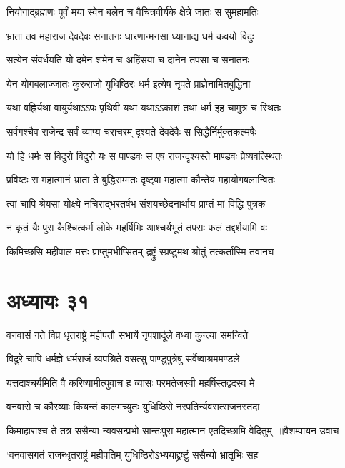 \twolineshloka
{नियोगाद्ब्रह्मणः पूर्वं मया स्वेन बलेन च}
{वैचित्रवीर्यके क्षेत्रे जातः स सुमहामतिः}


\twolineshloka
{भ्राता तव महाराज देवदेवः सनातनः}
{धारणान्मनसा ध्यानाद्य धर्म कवयो विदुः}


\twolineshloka
{सत्येन संवर्धयति यो दमेन शमेन च}
{अहिंसया च दानेन तपसा च सनातनः}


\twolineshloka
{येन योगबलाज्जातः कुरुराजो युधिष्ठिरः}
{धर्म इत्येष नृपते प्राज्ञेनामितबुद्धिना}


\twolineshloka
{यथा वह्निर्यथा वायुर्यथाऽऽपः पृथिवी यथा}
{यथाऽऽकाशं तथा धर्म इह चामुत्र च स्थितः}


\twolineshloka
{सर्वगश्चैव राजेन्द्र सर्वं व्याप्य चराचरम्}
{दृश्यते देवदेवैः स सिद्धैर्निर्मुक्तकल्मषैः}


\twolineshloka
{यो हि धर्मः स विदुरो विदुरो यः स पाण्डवः}
{स एष राजन्दृश्यस्ते माण्डवः प्रेष्यवत्स्थितः}


\twolineshloka
{प्रविष्टः स महात्मानं भ्राता ते बुद्धिसम्मतः}
{दृष्ट्वा महात्मा कौन्तेयं महायोगबलान्वितः}


\twolineshloka
{त्वां चापि श्रेयसा योक्ष्ये नचिराद्भरतर्षभ}
{संशयच्छेदनार्थाय प्राप्तं मां विद्धि पुत्रक}


\twolineshloka
{न कृतं यैः पुरा कैश्चित्कर्म लोके महर्षिभिः}
{आश्चर्यभूतं तपसः फलं तद्दर्शयामि वः}


\twolineshloka
{किमिच्छसि महीपाल मत्तः प्राप्तुमभीप्सितम्}
{द्रष्ट्रुं स्प्रष्टुमथ श्रोतुं तत्कर्तास्मि तवानघ}


\chapter{अध्यायः ३१}
\twolineshloka
{वनवासं गते विप्र धृतराष्ट्रे महीपतौ}
{सभार्ये नृपशार्दूले वध्वा कुन्त्या समन्विते}


\twolineshloka
{विदुरे चापि धर्मज्ञे धर्मराजं व्यपश्रिते}
{वसत्सु पाण्डुपुत्रेषु सर्वेष्वाश्रममण्डले}


\twolineshloka
{यत्तदाश्चर्यमिति वै करिष्यामीत्युवाच ह}
{व्यासः परमतेजस्वी महर्षिस्तद्वदस्व मे}


\twolineshloka
{वनवासे च कौरव्याः कियन्तं कालमच्युतः}
{युधिष्ठिरो नरपतिर्न्यवसत्सजनस्तदा}


\threelineshloka
{किमाहाराश्च ते तत्र ससैन्या न्यवसन्प्रभो}
{सान्तःपुरा महात्मान एतदिच्छामि वेदितुम् ॥वैशम्पायन उवाच}
{}


\twolineshloka
{`वनवासगतं राजन्धृतराष्ट्रं महीपतिम्}
{युधिष्ठिरोऽभ्ययाद्द्रष्टुं ससैन्यो भ्रातृभिः सह}


